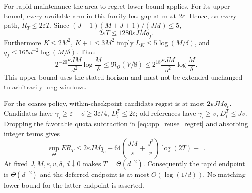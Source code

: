 For rapid maintenance the area-to-regret lower bound applies. For its upper
bound, every available arm in this family has gap at most $2\varepsilon$.
Hence, on every path, $R_T\le2\varepsilon T$. Since
$(J+1)(M+J+1)/(JM)\le5$,
\[
 2\varepsilon T\le1280\varepsilon JM q_f.
\]
Furthermore $K\le2M^2$, $K+1\le3M^2$ imply
$L_K\le5\log(M/\delta)$, and
$q_f\le165d^{-2}\log(M/\delta)$. Thus
\[
 2^{-20}\frac{\varepsilon JM}{d^2}\log\frac M\delta
 \le\mathfrak R_\Theta(V/8)
 \le2^{18}\frac{\varepsilon JM}{d^2}\log\frac M\delta.
\]
This upper bound uses the stated horizon and must not be extended unchanged
to arbitrarily long windows.

For the coarse policy, within-checkpoint candidate regret is at most
$2\varepsilon JM q_c$. Candidates have
$\gamma_i\ge\varepsilon-d\ge3\varepsilon/4$, $D_i^T\le2\varepsilon$;
old references have $\gamma_i\ge v$, $D_i^T\le Jv$. Dropping the favorable
quota subtraction in \eqref{eq:app_reuse_regret} and absorbing integer terms
gives
\[
 \sup_\Theta ER_T\le2\varepsilon JM q_c+
 64\left(\frac{JM}{\varepsilon}+\frac{J^2}{v}\right)\log(2T)+1.
\]
At fixed $J,M,\varepsilon,v,\delta$, $d\downarrow0$ makes
$T=\Theta(d^{-2})$. Consequently the rapid endpoint is $\Theta(d^{-2})$
and the deferred endpoint is at most $O(\log(1/d))$. No matching lower bound
for the latter endpoint is asserted.
